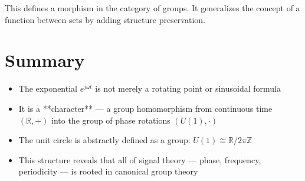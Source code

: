 \documentclass[12pt]{article}
\begin{document}
	This defines a morphism in the category of groups. It generalizes the concept of a function between sets by adding structure preservation.
	
	
	\section{Summary}
	
	\begin{itemize}[leftmargin=1.5em]
		\item The exponential \( e^{j\omega t} \) is not merely a rotating point or sinusoidal formula
		\item It is a **character** — a group homomorphism from continuous time \( (\mathbb{R}, +) \) into the group of phase rotations \( (U(1), \cdot) \)
		\item The unit circle is abstractly defined as a group: \( U(1) \cong \mathbb{R} / 2\pi \mathbb{Z} \)
		\item This structure reveals that all of signal theory — phase, frequency, periodicity — is rooted in canonical group theory
	\end{itemize}
	
	
	
\end{document}
